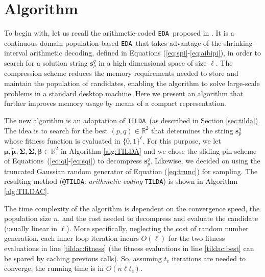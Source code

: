 \documentclass{sig-alternate}
\makeatletter
\newcommand{\bs}{{\mathbf s}}
\newcommand{\bmu}{{\boldsymbol \mu}}
\newcommand{\bsigma}{{\boldsymbol \Sigma}}
\newcommand{\bbeta}{{\boldsymbol \beta}}
\newcommand{\EDA}{\texttt{EDA}}
\newcommand{\TILDA}{\texttt{TILDA}}
\newcommand{\TILDAC}{\texttt{@TILDA}}
\newcommand{\Rdom}{\mbox{$\mathbb{R}$}}
\makeatother
\begin{document}
\section{Algorithm}
\label{sec:algorithm}
To begin with, let us recall the arithmetic-coded \EDA~proposed in \cite{Suwannik08}. It is a continuous domain population-based \EDA~that takes advantage of the shrinking-interval arithmetic decoding, defined in Equations (\ref{eq:spi}-\ref{eq:aibipi}), in order to search for a solution string $\bs_p^q$ in a high dimensional space of size $\ell$. The compression scheme reduces the memory requirements needed to store and maintain the population of candidates, enabling the algorithm to solve large-scale problems in a standard desktop machine. Here we present an algorithm that further improves memory usage by means of a compact representation. 

The new algorithm is an adaptation of \TILDA~(as described in Section \ref{sec:tilda}). The idea is to search for the best $(p, q) \in \Rdom^2$ that determines the string $\bs_p^q$ whose fitness function is evaluated in $\{0,1\}^\ell$. For this purpose, we let $\bmu, \tilde{\bmu}, \bsigma, \tilde{\bsigma}, \bbeta \in \Rdom^2$ in Algorithm \ref{alg:TILDA} and we chose the sliding-pin scheme of \mbox{Equations (\ref{eq:qi}-\ref{eq:sqi})} to decompress $\bs_p^q$. Likewise, we decided on using the truncated Gaussian random generator of Equation (\ref{eq:trunc}) for sampling. The resulting method (\TILDAC: \emph{arithmetic-coding} \TILDA) is shown in Algorithm \ref{alg:TILDAC}. 

The time complexity of the algorithm is dependent on the convergence speed, the population size $n$, and the cost needed to decompress and evaluate the candidate (usually linear in $\ell$). More specifically, neglecting the cost of random number generation, each inner loop iteration incurs $O(\ell)$ for the two fitness evaluations in line \ref{tildac:fitness} (the fitness evaluations in line \ref{tildac:best} can be spared by caching previous calls). So, assuming $t_c$ iterations are needed to converge, the running time is in $O(n \ell t_c)$. 
\end{document}

